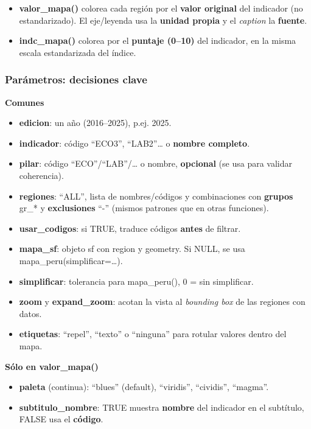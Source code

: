 \documentclass[
  11pt,
  letterpaper,
  DIV=11,
  numbers=noendperiod]{scrartcl}
\begin{document}
\begin{itemize}
\item
  \textbf{valor\_mapa()} colorea cada región por el \textbf{valor
  original} del indicador (no estandarizado). El eje/leyenda usa la
  \textbf{unidad propia} y el \emph{caption} la \textbf{fuente}.
\item
  \textbf{indc\_mapa()} colorea por el \textbf{puntaje (0--10)} del
  indicador, en la misma escala estandarizada del índice.
\end{itemize}

\subsubsection{\texorpdfstring{\textbf{Parámetros: decisiones
clave}}{Parámetros: decisiones clave}}\label{paruxe1metros-decisiones-clave-1}

\textbf{Comunes}

\begin{itemize}
\item
  \textbf{edicion}: un año (2016--2025), p.ej. 2025.
\item
  \textbf{indicador}: código ``ECO3'', ``LAB2''\ldots{} o \textbf{nombre
  completo}.
\item
  \textbf{pilar}: código ``ECO''/``LAB''/\ldots{} o nombre,
  \textbf{opcional} (se usa para validar coherencia).
\item
  \textbf{regiones}: ``ALL'', lista de nombres/códigos y combinaciones
  con \textbf{grupos} gr\_* y \textbf{exclusiones} ``-'' (mismos
  patrones que en otras funciones).
\item
  \textbf{usar\_codigos}: si TRUE, traduce códigos \textbf{antes} de
  filtrar.
\item
  \textbf{mapa\_sf}: objeto sf con region y geometry. Si NULL, se usa
  mapa\_peru(simplificar=\ldots).
\item
  \textbf{simplificar}: tolerancia para mapa\_peru(), 0 = sin
  simplificar.
\item
  \textbf{zoom} y \textbf{expand\_zoom}: acotan la vista al
  \emph{bounding box} de las regiones con datos.
\item
  \textbf{etiquetas}: ``repel'', ``texto'' o ``ninguna'' para rotular
  valores dentro del mapa.
\end{itemize}

\textbf{Sólo en valor\_mapa()}

\begin{itemize}
\item
  \textbf{paleta} (continua): ``blues'' (default), ``viridis'',
  ``cividis'', ``magma''.
\item
  \textbf{subtitulo\_nombre}: TRUE muestra \textbf{nombre} del indicador
  en el subtítulo, FALSE usa el \textbf{código}.
\end{itemize}
\end{document}
